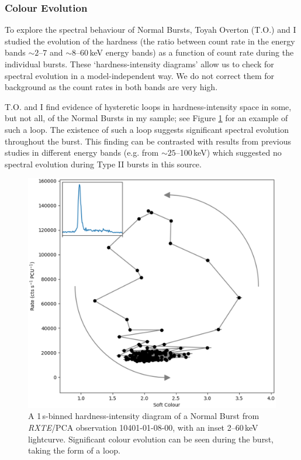 \subsubsection{Colour Evolution}

\par To explore the spectral behaviour of Normal Bursts, Toyah Overton (\textsf{T.O.}) and I studied the evolution of the hardness (the ratio between count rate in the energy bands $\sim2$--$7$ and $\sim8$--$60$\,keV energy bands) as a function of count rate during the individual bursts.  These `hardness-intensity diagrams' allow us to check for spectral evolution in a model-independent way.  We do not correct them for background as the count rates in both bands are very high.
\par \textsf{T.O.} and I find evidence of hysteretic loops in hardness-intensity space in some, but not all, of the Normal Bursts in my sample; see Figure \ref{fig:loop} for an example of such a loop.  The existence of such a loop suggests significant spectral evolution throughout the burst.  This finding can be contrasted with results from previous studies in different energy bands (e.g. \citealp{Woods_OB2} from $\sim25$--100\,keV) which suggested no spectral evolution during Type II bursts in this source.

\begin{figure}
  \centering
  \includegraphics[width=.9\linewidth, trim={0.4cm 1cm 1.1cm 1cm},clip]{images/Loop1.eps}
  \caption[A hardness-intensity diagram of a typical Normal Burst.]{\small A 1\,s-binned hardness-intensity diagram of a Normal Burst from \textit{RXTE}/PCA observation 10401-01-08-00, with an inset 2--60\,keV lightcurve.  Significant colour evolution can be seen during the burst, taking the form of a loop.}
  \label{fig:loop}
\end{figure}

